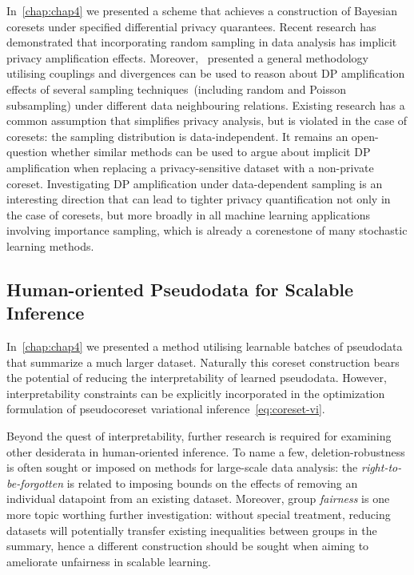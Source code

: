 In~\cref{chap:chap4} we presented a scheme that achieves a construction of Bayesian coresets under specified differential privacy quarantees. Recent research has demonstrated that incorporating random sampling in data analysis has implicit privacy amplification effects. Moreover,~\citep{balle18} presented a general methodology utilising couplings and divergences can be used to reason about DP amplification effects of several sampling techniques~(including random and Poisson subsampling) under different data neighbouring relations. Existing research has a common assumption that simplifies privacy analysis, but is violated in the case of coresets: the sampling distribution is data-independent. It remains an open-question whether similar methods can be used to argue about implicit DP amplification when replacing a privacy-sensitive dataset with a non-private coreset. Investigating DP amplification under data-dependent sampling is an interesting direction that can lead to tighter privacy quantification not only in the case of coresets, but more broadly in all machine learning applications involving importance sampling, which is already a corenestone of many stochastic learning methods. 


\subsection{Human-oriented Pseudodata for Scalable Inference}
\label{subsec:human-oriented-pseudodata}

In~\cref{chap:chap4} we presented a method utilising learnable batches of pseudodata that summarize a much larger dataset. Naturally this coreset construction bears the potential of reducing the interpretability of learned pseudodata. However, interpretability constraints can be explicitly incorporated in the optimization formulation of pseudocoreset variational inference~\cref{eq:coreset-vi}.

Beyond the quest of interpretability, further research is required for examining other desiderata in human-oriented inference. To name a few, deletion-robustness is often sought or imposed on methods for large-scale data analysis: the \emph{right-to-be-forgotten} is related to imposing bounds on  the effects of removing an individual datapoint from an existing dataset. Moreover, group \emph{fairness} is one more topic worthing further investigation: without special treatment, reducing datasets will potentially transfer existing inequalities between groups in the summary, hence a different construction should be sought when aiming to ameliorate unfairness in scalable learning.  